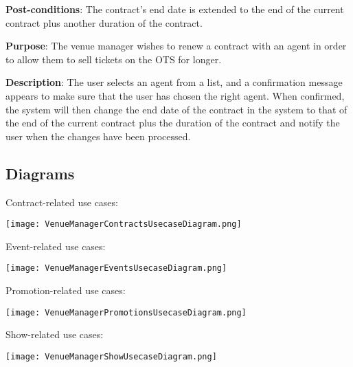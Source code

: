 \textbf{Post-conditions}: The contract's end date is extended to the
end of the current contract plus another duration of the contract.

\textbf{Purpose}: The venue manager wishes to renew a contract with
an agent in order to allow them to sell tickets on the OTS for longer.

\textbf{Description}: The user selects an agent from a list,
and a confirmation message appears to make sure that the user
has chosen the right agent. When confirmed, the system will
then change the end date of the contract in the system to that
of the end of the current contract plus the duration of the
contract and notify the user when the changes have been processed.

\subsection{Diagrams}
Contract-related use cases:

\medskip
\texttt{[image: VenueManagerContractsUsecaseDiagram.png]}
\medskip

Event-related use cases:

\medskip
\texttt{[image: VenueManagerEventsUsecaseDiagram.png]}
\medskip

Promotion-related use cases:

\medskip
\texttt{[image: VenueManagerPromotionsUsecaseDiagram.png]}
\medskip

Show-related use cases:

\medskip
\texttt{[image: VenueManagerShowUsecaseDiagram.png]}
